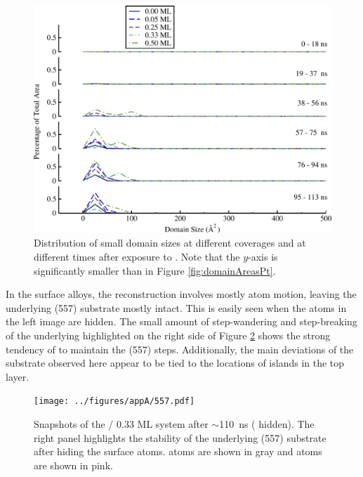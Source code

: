 \begin{figure}
  \centering
  \includegraphics[width=\linewidth]{../figures/appA/domainSizes_Pt_SI_smallFocus.pdf}
  \caption{Distribution of small  domain sizes at different
     coverages and at different times after exposure to
    . Note that the $y$-axis is significantly smaller than in
    Figure \ref{fig:domainAreasPt}.}
\label{fig:Pt_SI_small}
\end{figure}
\newpage




In the surface alloys, the reconstruction involves mostly  atom
motion, leaving the underlying (557) substrate mostly intact.
This is easily seen when the  atoms in the left image are
hidden.  The small amount of step-wandering and step-breaking of the
underlying  highlighted on the right side of Figure \ref{fig:557}
shows the strong tendency of  to maintain the (557) steps.
Additionally, the main deviations of the  substrate observed
here appear to be tied to the locations of islands in the  top
layer.

\begin{figure}
  \texttt{[image: ../figures/appA/557.pdf]}
  \caption{Snapshots of the / 0.33 ML system after
    $\sim$110~ns ( hidden). The right panel highlights the
    stability of the underlying (557)  substrate after hiding
    the surface  atoms.  atoms are shown in gray and
     atoms are shown in pink.}
\label{fig:557}
\end{figure}
\newpage

